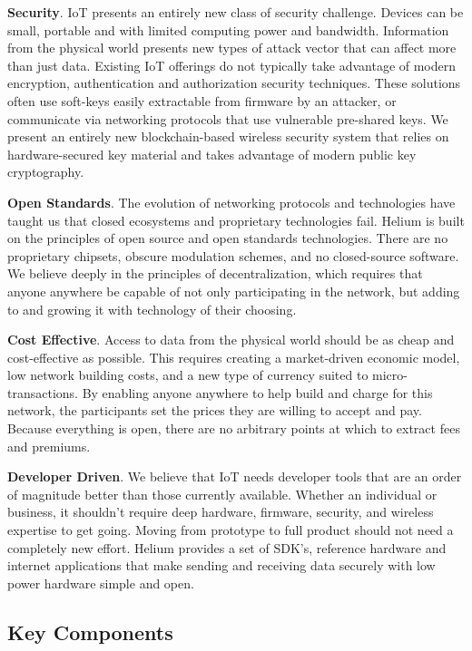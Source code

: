 \documentclass[letterpaper,11pt]{article}
\begin{document}
\textbf{Security}. IoT presents an entirely new class of security challenge. Devices can be small, portable and with limited computing power and bandwidth. Information from the physical world presents new types of attack vector that can affect more than just data. Existing IoT offerings do not typically take advantage of modern encryption, authentication and authorization security techniques. These solutions often use soft-keys easily extractable from firmware by an attacker, or communicate via networking protocols that use vulnerable pre-shared keys. We present an entirely new blockchain-based wireless security system that relies on hardware-secured key material and takes advantage of modern public key cryptography.

\textbf{Open Standards}. The evolution of networking protocols and technologies have taught us that closed ecosystems and proprietary technologies fail. Helium is built on the principles of open source and open standards technologies. There are no proprietary chipsets, obscure modulation schemes, and no closed-source software. We believe deeply in the principles of decentralization, which requires that anyone anywhere be capable of not only participating in the network, but adding to and growing it with technology of their choosing.

\textbf{Cost Effective}. Access to data from the physical world should be as cheap and cost-effective as possible. This requires creating a market-driven economic model, low network building costs, and a new type of currency suited to micro-transactions. By enabling anyone anywhere to help build and charge for this network, the participants set the prices they are willing to accept and pay. Because everything is open, there are no arbitrary points at which to extract fees and premiums.

\textbf{Developer Driven}. We believe that IoT needs developer tools that are an order of magnitude better than those currently available. Whether an individual or business, it shouldn't require deep hardware, firmware, security, and wireless expertise to get going. Moving from prototype to full product should not need a completely new effort. Helium provides a set of SDK's, reference hardware and internet applications that make sending and receiving data securely with low power hardware simple and open.

\subsection{Key Components}
\end{document}

